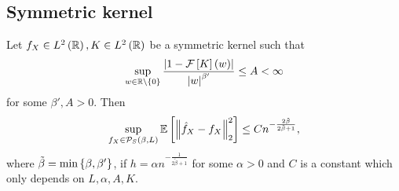 
\subsection{Symmetric kernel}
\begin{theorem}\label{thm:sym_ker}
	Let $f_X\in L^2\left(\mathbb{R}\right), K\in L^2\left(\mathbb{R}\right)$ be a symmetric kernel such that
	\begin{equation*}\label{eq:tocheck}
		\sup_{w\in \mathbb{R}\setminus \left\{0\right\}} \frac{\left| 1- \mathcal{F} \left[K\right] \left(w\right)\right|}{\left| w\right|^{\beta'}}\leq A <\infty
	\end{equation*}
	for some $\beta',A>0$. Then
	\begin{equation*}
		\sup_{f_X\in \mathcal{P}_S \left(\beta, L\right)} \mathbb{E}\left[\left\| \hat{f}_X - f_X \right\|^2_2\right]\leq C n^{-\frac{2\tilde{\beta}}{2\tilde{\beta}+1}},
	\end{equation*}
	where $\tilde{\beta}=\min \left\{\beta,\beta'\right\}$, if $h= \alpha n^{-\frac{1}{2\tilde{\beta} +1}}$ for some $\alpha >0$ and $C$ is a constant which only depends on $L,\alpha,A,K$.
\end{theorem}

